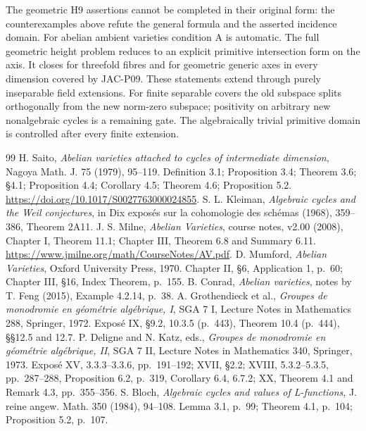 \documentclass[11pt,a4paper]{article}
\begin{document}
The geometric H9 assertions cannot be completed in their original form:
the counterexamples above refute the general formula and the asserted
incidence domain. For abelian ambient varieties condition A is automatic.
The full geometric height problem reduces to an explicit primitive
intersection form on the axis. It closes for threefold fibres and for
geometric generic axes in every dimension covered by JAC-P09. These
statements extend through purely inseparable field extensions. For
finite separable covers the old subspace splits orthogonally from the
new norm-zero subspace; positivity on arbitrary new nonalgebraic cycles
is a remaining gate. The algebraically trivial primitive domain is
controlled after every finite extension.
\begin{thebibliography}{99}
 H. Saito, \emph{Abelian varieties attached to cycles of intermediate dimension}, Nagoya Math. J. 75 (1979), 95--119. Definition 3.1; Proposition 3.4; Theorem 3.6; \S4.1; Proposition 4.4; Corollary 4.5; Theorem 4.6; Proposition 5.2. \url{https://doi.org/10.1017/S0027763000024855}.
 S. L. Kleiman, \emph{Algebraic cycles and the Weil conjectures}, in Dix expos\'es sur la cohomologie des sch\'emas (1968), 359--386, Theorem 2A11.
 J. S. Milne, \emph{Abelian Varieties}, course notes, v2.00 (2008), Chapter I, Theorem 11.1; Chapter III, Theorem 6.8 and Summary 6.11. \url{https://www.jmilne.org/math/CourseNotes/AV.pdf}.
 D. Mumford, \emph{Abelian Varieties}, Oxford University Press, 1970. Chapter II, \S6, Application 1, p.~60; Chapter III, \S16, Index Theorem, p.~155.
 B. Conrad, \emph{Abelian varieties}, notes by T. Feng (2015), Example 4.2.14, p.~38.
 A. Grothendieck et al., \emph{Groupes de monodromie en g\'eom\'etrie alg\'ebrique, I}, SGA 7 I, Lecture Notes in Mathematics 288, Springer, 1972. Expos\'e IX, \S9.2, 10.3.5 (p.~443), Theorem 10.4 (p.~444), \S\S12.5 and 12.7.
 P. Deligne and N. Katz, eds., \emph{Groupes de monodromie en g\'eom\'etrie alg\'ebrique, II}, SGA 7 II, Lecture Notes in Mathematics 340, Springer, 1973. Expos\'e XV, 3.3.3--3.3.6, pp.~191--192; XVII, \S2.2; XVIII, 5.3.2--5.3.5, pp.~287--288, Proposition 6.2, p.~319, Corollary 6.4, 6.7.2; XX, Theorem 4.1 and Remark 4.3, pp.~355--356.
 S. Bloch, \emph{Algebraic cycles and values of L-functions}, J. reine angew. Math. 350 (1984), 94--108. Lemma 3.1, p.~99; Theorem 4.1, p.~104; Proposition 5.2, p.~107.
\end{thebibliography}
\end{document}
